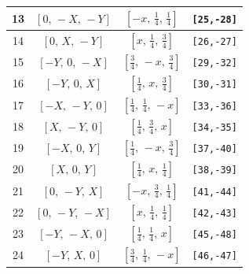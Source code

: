 \documentclass[fleqn,8pt]{jsarticle}
\begin{document}
\begin{longtable}{cccc}
13 & $\left[ 0,\, - X,\, - Y \right]$ & $\left[ - x,\, \frac{1}{4},\, \frac{1}{4} \right]$ & {\tt [25,-28]} \\ \hline
14 & $\left[ 0,\, X,\, - Y \right]$ & $\left[ x,\, \frac{1}{4},\, \frac{3}{4} \right]$ & {\tt [26,-27]} \\ \hline
15 & $\left[ - Y,\, 0,\, - X \right]$ & $\left[ \frac{3}{4},\, - x,\, \frac{3}{4} \right]$ & {\tt [29,-32]} \\ \hline
16 & $\left[ - Y,\, 0,\, X \right]$ & $\left[ \frac{1}{4},\, x,\, \frac{3}{4} \right]$ & {\tt [30,-31]} \\ \hline
17 & $\left[ - X,\, - Y,\, 0 \right]$ & $\left[ \frac{1}{4},\, \frac{1}{4},\, - x \right]$ & {\tt [33,-36]} \\ \hline
18 & $\left[ X,\, - Y,\, 0 \right]$ & $\left[ \frac{1}{4},\, \frac{3}{4},\, x \right]$ & {\tt [34,-35]} \\ \hline
19 & $\left[ - X,\, 0,\, Y \right]$ & $\left[ \frac{1}{4},\, - x,\, \frac{3}{4} \right]$ & {\tt [37,-40]} \\ \hline
20 & $\left[ X,\, 0,\, Y \right]$ & $\left[ \frac{1}{4},\, x,\, \frac{1}{4} \right]$ & {\tt [38,-39]} \\ \hline
21 & $\left[ 0,\, - Y,\, X \right]$ & $\left[ - x,\, \frac{3}{4},\, \frac{1}{4} \right]$ & {\tt [41,-44]} \\ \hline
22 & $\left[ 0,\, - Y,\, - X \right]$ & $\left[ x,\, \frac{1}{4},\, \frac{1}{4} \right]$ & {\tt [42,-43]} \\ \hline
23 & $\left[ - Y,\, - X,\, 0 \right]$ & $\left[ \frac{1}{4},\, \frac{1}{4},\, x \right]$ & {\tt [45,-48]} \\ \hline
24 & $\left[ - Y,\, X,\, 0 \right]$ & $\left[ \frac{3}{4},\, \frac{1}{4},\, - x \right]$ & {\tt [46,-47]} \\
\end{longtable}
\renewcommand{\arraystretch}{1.2}
\end{document}

